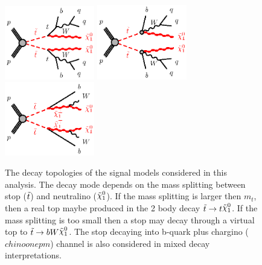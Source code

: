 \begin{figure}[htb]
  \begin{center}
    \includegraphics[width=0.35\textwidth]{figures/feynDiag/stst-bqqbqqN1N1-tt.eps}\hspace{0.05\textwidth}
    \includegraphics[width=0.35\textwidth]{figures/feynDiag/stst-bqqbqqN1N1-3body.eps}\hspace{0.05\textwidth}
    \includegraphics[width=0.35\textwidth]{figures/feynDiag/stst-bbWWN1N1.eps}\hspace{0.05\textwidth}
\end{center}
\caption{The decay topologies of the signal models considered in this analysis.  The decay mode depends on the mass splitting between stop ($\tilde{t}$) and neutralino ($\ninoone$).   If the mass splitting is larger then $m_t$, then a real top maybe produced in the 2 body decay $\stop\rightarrow t\ninoone$. If the mass splitting is too small then a stop may decay through a virtual top to ${\stop}\rightarrow bW\ninoone$.  The stop decaying into b-quark plus chargino ($chinoonepm$) channel is also considered in mixed decay interpretations. }
\label{fig:feynDiagModels} 
\end{figure}

